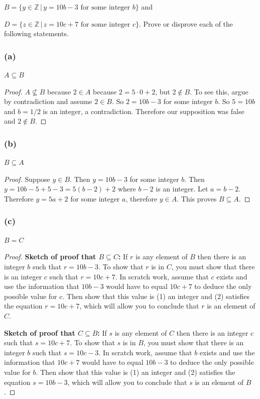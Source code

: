 \documentclass[14pt]{extarticle}
\newcommand{\Z}{\mathbb{Z}}
\begin{document}
\(B = \{y \in \Z \, | \, y = 10b-3 \text{ for some integer } b\}\) and 

\(D = \{z \in \Z \, | \, z = 10c+7 \text{ for some integer } c\}\). 
Prove or disprove each of the following statements.

\subsubsection{(a)}
\(A \subseteq B\)

\begin{proof}
\(A \nsubseteq B\) because \(2 \in A\) because \(2 = 5 \cdot 0 + 2\), but \(2 \notin B\). To see this, argue by
contradiction and assume \(2 \in B\). So \(2 = 10b - 3\) for some integer $b$. So \(5 = 10b\) and \(b = 1/2\) is an
integer, a contradiction. Therefore our supposition was false and \(2 \notin B\).
\end{proof}

\subsubsection{(b)}
\(B \subseteq A\)

\begin{proof}
Suppose \(y \in B\). Then \(y = 10b - 3\) for some integer $b$. Then \(y = 10b - 5 + 5 - 3 = 5(b-2) + 2\) where $b-2$
is an integer. Let \(a = b-2\). Therefore \(y = 5a + 2\) for some integer $a$, therefore \(y \in A\). 
This proves \(B \subseteq A\).
\end{proof}

\subsubsection{(c)}
$B = C$

\begin{proof}
{\bf Sketch of proof that \(B \subseteq C\):} If $r$ is any element of $B$ then there is an integer $b$ such that 
\(r = 10b - 3\). To show that $r$ is in $C$, you must show that there is an integer $c$ such that \(r = 10c + 7\). In 
scratch work, assume that $c$ exists and use the information that \(10b - 3\) would have to equal 
\(10c + 7\) to deduce the only possible value for $c$. Then show that this value is (1) an integer and (2) satisfies 
the equation \(r = 10c + 7\), which will allow you to conclude that $r$ is an element of $C$.

{\bf Sketch of proof that \(C \subseteq B\):} If $s$ is any element of $C$ then there is an integer $c$ such that 
\(s = 10c + 7\). To show that $s$ is in $B$, you must show that there is an integer $b$ such that \(s = 10c - 3\). In 
scratch work, assume that $b$ exists and use the information that \(10c + 7\) would have to equal 
\(10b - 3\) to deduce the only possible value for $b$. Then show that this value is (1) an integer and (2) satisfies 
the equation \(s = 10b - 3\), which will allow you to conclude that $s$ is an element of $B$.
\end{proof}
\end{document}
